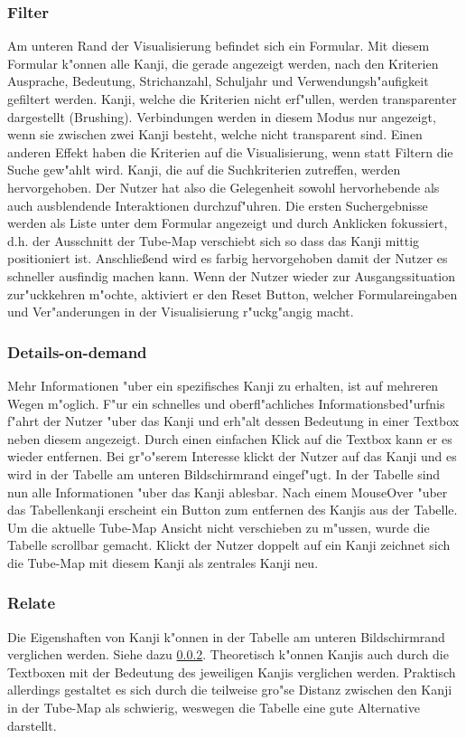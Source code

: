 \subsubsection{Filter}\label{Filter}
Am unteren Rand der Visualisierung befindet sich ein Formular. Mit diesem Formular k"onnen alle Kanji, die gerade angezeigt werden, nach den Kriterien Ausprache, Bedeutung, Strichanzahl, Schuljahr und Verwendungsh"aufigkeit gefiltert werden. Kanji, welche die Kriterien nicht erf"ullen, werden transparenter dargestellt (Brushing). Verbindungen werden in diesem Modus nur angezeigt, wenn sie zwischen zwei Kanji besteht, welche nicht transparent sind. Einen anderen Effekt haben die Kriterien auf die Visualisierung, wenn statt Filtern die Suche gew"ahlt wird. Kanji, die auf die Suchkriterien zutreffen, werden hervorgehoben. Der Nutzer hat also die Gelegenheit sowohl hervorhebende als auch ausblendende Interaktionen durchzuf"uhren. Die ersten Suchergebnisse werden als Liste unter dem Formular angezeigt und durch Anklicken fokussiert, d.h. der Ausschnitt der Tube-Map verschiebt sich so dass das Kanji mittig positioniert ist. Anschließend  wird es farbig hervorgehoben damit der Nutzer es schneller ausfindig machen kann. Wenn der Nutzer wieder zur Ausgangssituation zur"uckkehren m"ochte, aktiviert er den Reset Button, welcher Formulareingaben und Ver"anderungen in der Visualisierung r"uckg"angig macht.

\subsubsection{Details-on-demand}\label{Details-on-demand}
Mehr Informationen "uber ein spezifisches Kanji zu erhalten, ist auf mehreren Wegen m"oglich. F"ur ein schnelles und oberfl"achliches Informationsbed"urfnis f"ahrt der Nutzer "uber das Kanji und erh"alt dessen Bedeutung in einer Textbox neben diesem angezeigt. Durch einen einfachen Klick auf die Textbox kann er es wieder entfernen. Bei gr"o"serem Interesse klickt der Nutzer auf das Kanji und es wird in der Tabelle am unteren Bildschirmrand eingef"ugt. In der Tabelle sind nun alle Informationen "uber das Kanji ablesbar. Nach einem MouseOver "uber das Tabellenkanji erscheint ein Button zum entfernen des Kanjis aus der Tabelle. Um die aktuelle Tube-Map Ansicht nicht verschieben zu m"ussen, wurde die Tabelle scrollbar gemacht. Klickt der Nutzer doppelt auf ein Kanji zeichnet sich die Tube-Map mit diesem Kanji als zentrales Kanji neu. 

\subsubsection{Relate}
Die Eigenshaften von Kanji k"onnen in der Tabelle am unteren Bildschirmrand verglichen werden. Siehe dazu \ref{Details-on-demand}. Theoretisch k"onnen Kanjis auch durch die Textboxen mit der Bedeutung des jeweiligen Kanjis verglichen werden. Praktisch allerdings gestaltet es sich durch die teilweise gro"se Distanz zwischen den Kanji in der Tube-Map als schwierig, weswegen die Tabelle eine gute Alternative darstellt. 


